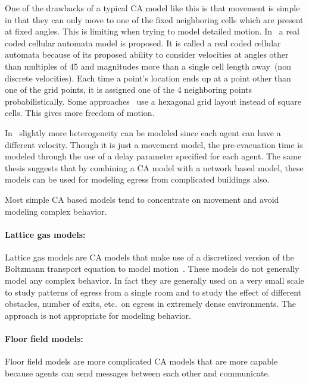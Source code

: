 One of the drawbacks of a typical CA model like this is that movement is simple in that they can only move to one of the fixed neighboring cells which are present at fixed angles. This is limiting when trying to model detailed motion. In~\cite{Yamamoto:2007dc} a real coded cellular automata model is proposed. It is called a real coded cellular automata because of its proposed ability to consider velocities at angles other than multiples of 45 and magnitudes more than a single cell length away~(non discrete velocities). Each time a point's location ends up at a point other than one of the grid points, it is assigned one of the 4 neighboring points probabilistically. Some approaches~\cite{Klein:2009} use a hexagonal grid layout instead of square cells. This gives more freedom of motion.

In~\cite{Klupfel:2003wa} slightly more heterogeneity can be modeled since each agent can have a different velocity. Though it is just a movement model, the pre-evacuation time is modeled through the use of a delay parameter specified for each agent. The same thesis suggests that by combining a CA model with a network based model, these models can be used for modeling egress from complicated buildings also.

Most simple CA based models tend to concentrate on movement and avoid modeling complex behavior.


\paragraph{Lattice gas models:}

Lattice gas models are CA models that make use of a discretized version of the Boltzmann transport equation to model motion~\cite{Marconi:2002ue,Marconi2002,Nagai:2004kl}. These models do not generally model any complex behavior. In fact they are generally used on a very small scale to study patterns of egress from a single room and to study the effect of different obstacles, number of exits, etc.\ on egress in extremely dense environments. The approach is not appropriate for modeling behavior.

\paragraph{Floor field models:}

Floor field models are more complicated CA models that are more capable because agents can send messages between each other and communicate.

